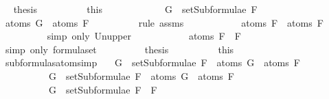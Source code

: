 \begin{isabellebody}
\ \isamarkupfalse%
\ {\isacharquery}thesis\isanewline
\ \ \ \ \ \ \ \ \isamarkupfalse%
\ this\isanewline
\ \ \ \ \isamarkupfalse%
\isanewline
\ \ \ \ \ \ \isamarkupfalse%
\ {\isachardoublequoteopen}G\ {\isasymin}\ setSubformulae\ F{}{\isachardoublequoteclose}\isanewline
\ \ \ \ \ \ \isamarkupfalse%
\ \isamarkupfalse%
\ {\isachardoublequoteopen}atoms\ G\ {\isasymsubseteq}\ atoms\ F{}{\isachardoublequoteclose}\isanewline
\ \ \ \ \ \ \ \ \isamarkupfalse%
\ {\isacharparenleft}rule\ assms{\isacharparenleft}{}{\isacharparenright}{\isacharparenright}\isanewline
\ \ \ \ \ \ \isamarkupfalse%
\ \isamarkupfalse%
\ {\isachardoublequoteopen}{\isasymdots}\ {\isasymsubseteq}\ atoms\ F{}\ {\isasymunion}\ atoms\ F{}{\isachardoublequoteclose}\isanewline
\ \ \ \ \ \ \ \ \isamarkupfalse%
\ {\isacharparenleft}simp\ only{\isacharcolon}\ Un{\isacharunderscore}upper{}{\isacharparenright}\isanewline
\ \ \ \ \ \ \isamarkupfalse%
\ \isamarkupfalse%
\ {\isachardoublequoteopen}{\isasymdots}\ {\isacharequal}\ atoms\ {\isacharparenleft}F{}\ \isactrlbold {\isasymor}\ F{}{\isacharparenright}{\isachardoublequoteclose}\isanewline
\ \ \ \ \ \ \ \ \isamarkupfalse%
\ {\isacharparenleft}simp\ only{\isacharcolon}\ formula{\isachardot}set{\isacharparenleft}{}{\isacharparenright}{\isacharparenright}\isanewline
\ \ \ \ \ \ \isamarkupfalse%
\ \isamarkupfalse%
\ {\isacharquery}thesis\isanewline
\ \ \ \ \ \ \ \ \isamarkupfalse%
\ this\isanewline
\ \ \ \ \isamarkupfalse%
\isanewline
\ \ \isamarkupfalse%
\isanewline
{}\isamarkupfalse%
%
\endisatagproof
{\isafoldproof}%
%
\isadelimproof
\isanewline
%
\endisadelimproof
\isanewline
{}\isamarkupfalse%
\ subformulas{\isacharunderscore}atoms{\isacharunderscore}imp{\isacharcolon}\isanewline
\ \ \ {\isachardoublequoteopen}G\ {\isasymin}\ setSubformulae\ F{}\ {\isasymLongrightarrow}\ atoms\ G\ {\isasymsubseteq}\ atoms\ F{}{\isachardoublequoteclose}\isanewline
\ \ \ \ \ \ \ \ \ \ {\isachardoublequoteopen}G\ {\isasymin}\ setSubformulae\ F{}\ {\isasymLongrightarrow}\ atoms\ G\ {\isasymsubseteq}\ atoms\ F{}{\isachardoublequoteclose}\isanewline
\ \ \ \ \ \ \ \ \ \ {\isachardoublequoteopen}G\ {\isasymin}\ setSubformulae\ {\isacharparenleft}F{}\ \isactrlbold {\isasymrightarrow}\ F{}{\isacharparenright}{\isachardoublequoteclose}\isanewline

\end{isabellebody}
